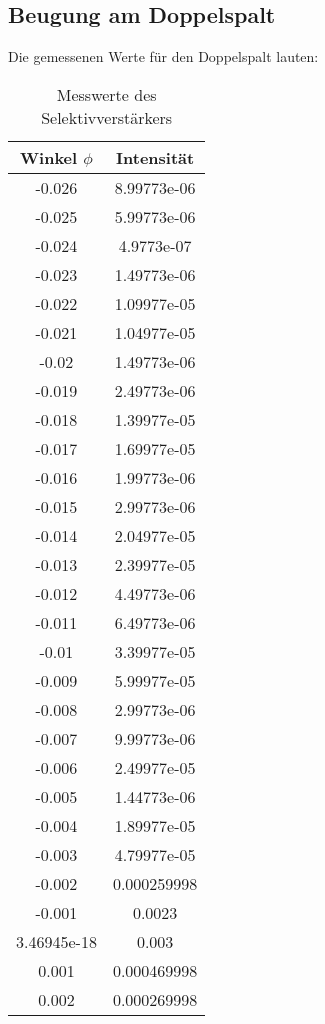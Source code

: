   
\subsection{Beugung am Doppelspalt}
  Die gemessenen Werte für den Doppelspalt lauten:
  \begin{table}[H]
    \centering
    \caption{Messwerte des Selektivverstärkers}
    \label{tab:mag}
    \begin{tabular}{c c}
     \toprule
      Winkel $\phi$ & Intensität\\
     \midrule
  -0.026       & 8.99773e-06 \\
 -0.025       & 5.99773e-06 \\
 -0.024       & 4.9773e-07  \\
 -0.023       & 1.49773e-06 \\
 -0.022       & 1.09977e-05 \\
 -0.021       & 1.04977e-05 \\
 -0.02        & 1.49773e-06 \\
 -0.019       & 2.49773e-06 \\
 -0.018       & 1.39977e-05 \\
 -0.017       & 1.69977e-05 \\
 -0.016       & 1.99773e-06 \\
 -0.015       & 2.99773e-06 \\
 -0.014       & 2.04977e-05 \\
 -0.013       & 2.39977e-05 \\
 -0.012       & 4.49773e-06 \\
 -0.011       & 6.49773e-06 \\
 -0.01        & 3.39977e-05 \\
 -0.009       & 5.99977e-05 \\
 -0.008       & 2.99773e-06 \\
 -0.007       & 9.99773e-06 \\
 -0.006       & 2.49977e-05 \\
 -0.005       & 1.44773e-06 \\
 -0.004       & 1.89977e-05 \\
 -0.003       & 4.79977e-05 \\
 -0.002       & 0.000259998 \\
 -0.001       & 0.0023      \\
  3.46945e-18 & 0.003       \\
  0.001       & 0.000469998 \\
  0.002       & 0.000269998 \\

\end{tabular}
\end{table}
